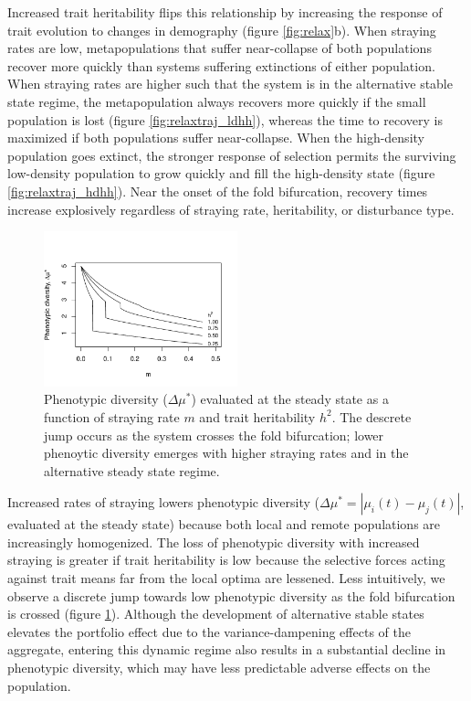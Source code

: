 \documentclass[twocolumn,preprintnumbers,amsmath,amssymb,superscriptaddress]{revtex4}
\begin{document}
Increased trait heritability flips this relationship by increasing the response of trait evolution to changes in demography (figure \ref{fig:relax}b).
When straying rates are low, metapopulations that suffer near-collapse of both populations recover more quickly than systems suffering extinctions of either population.
When straying rates are higher such that the system is in the alternative stable state regime, the metapopulation always recovers more quickly if the small population is lost (figure \ref{fig:relaxtraj_ldhh}), whereas the time to recovery is maximized if both populations suffer near-collapse.
When the high-density population goes extinct, the stronger response of selection permits the surviving low-density population to grow quickly and fill the high-density state (figure \ref{fig:relaxtraj_hdhh}).
Near the onset of the fold bifurcation, recovery times increase explosively regardless of straying rate, heritability, or disturbance type.


\begin{figure}
  \captionsetup{justification=raggedright,
singlelinecheck=false
}
\centering
\includegraphics[width=0.5\textwidth]{figs2/fig_traitdiff.pdf}
\caption{
Phenotypic diversity ($\Delta \mu^*$) evaluated at the steady state as a function of straying rate $m$ and trait heritability $h^2$. The descrete jump occurs as the system crosses the fold bifurcation; lower phenoytic diversity emerges with higher straying rates and in the alternative steady state regime. 
} \label{fig:traitdiff}
\end{figure}

Increased rates of straying lowers phenotypic diversity ($\Delta \mu^* = |\mu_i(t)-\mu_j(t)|$, evaluated at the steady state) because both local and remote populations are increasingly homogenized.
The loss of phenotypic diversity with increased straying is greater if trait heritability is low because the selective forces acting against trait means far from the local optima are lessened. %
Less intuitively, we observe a discrete jump towards low phenotypic diversity as the fold bifurcation is crossed (figure \ref{fig:traitdiff}).
Although the development of alternative stable states elevates the portfolio effect due to the variance-dampening effects of the aggregate, entering this dynamic regime also results in a substantial decline in phenotypic diversity, which may have less predictable adverse effects on the population. 
\\
\end{document}
